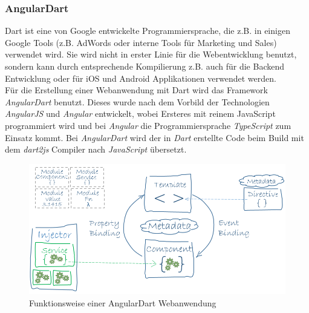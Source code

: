 \subsubsection{AngularDart}
\label{sec:angulardart}

Dart ist eine von Google entwickelte Programmiersprache, die z.B. in einigen Google Tools (z.B. AdWords oder interne Tools für Marketing und Sales) verwendet wird. Sie wird nicht in erster Linie für die Webentwicklung benutzt, sondern kann durch entsprechende Kompilierung z.B. auch für die Backend Entwicklung oder für iOS und Android Applikationen verwendet werden.\\
Für die Erstellung einer Webanwendung mit Dart wird das Framework \textit{AngularDart}\cite{angularDart}  benutzt. Dieses wurde nach dem Vorbild der Technologien \textit{AngularJS} und \textit{Angular} entwickelt, wobei Ersteres mit reinem JavaScript programmiert wird und bei \textit{Angular} die Programmiersprache \textit{TypeScript} zum Einsatz kommt. Bei \textit{AngularDart} wird der in \textit{Dart} erstellte Code beim Build mit dem \textit{dart2js} Compiler nach \textit{JavaScript} übersetzt.

\begin{figure}[h!]
	\centering
	\includegraphics[width=.8\linewidth]{figures/angulardart}
	\caption{Funktionsweise einer AngularDart Webanwendung\cite{angularDart}}
	\label{fig:angulardart}
\end{figure}


